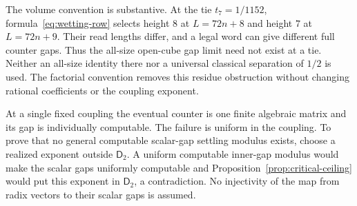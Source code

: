 The volume convention is substantive. At the tie $t_7=1/1152$,
formula~\eqref{eq:wetting-row} selects height $8$ at
$L=72n+8$ and height $7$ at $L=72n+9$. Their read lengths differ,
and a legal word can give different full counter gaps. Thus the
all-size open-cube gap limit need not exist at a tie. Neither an
all-size identity there nor a universal classical separation of
$1/2$ is used. The factorial convention removes this residue
obstruction without changing rational coefficients or the
coupling exponent.

At a single fixed coupling the eventual counter is one finite
algebraic matrix and its gap is individually computable. The
failure is uniform in the coupling. To prove that no general
computable scalar-gap settling modulus exists, choose a realized
exponent outside $\mathsf D_2$. A uniform computable inner-gap
modulus would make the scalar gaps uniformly computable and
Proposition~\ref{prop:critical-ceiling} would put this exponent
in $\mathsf D_2$, a contradiction. No injectivity of the map
from radix vectors to their scalar gaps is assumed.
